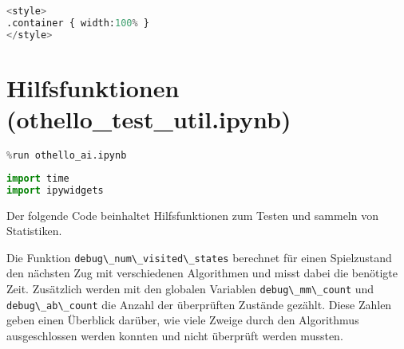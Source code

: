 \begin{lstlisting}[language=Python]
%%HTML
<style>
.container { width:100% }
</style>
\end{lstlisting}

\hypertarget{hilfsfunktionen-othello_test_util.ipynb}{%
\section{Hilfsfunktionen
(othello\_test\_util.ipynb)}\label{hilfsfunktionen-othello_test_util.ipynb}}

\begin{lstlisting}[language=Python]
%run othello_game.ipynb
%run othello_ai.ipynb
\end{lstlisting}

\begin{lstlisting}[language=Python]
import time
import ipywidgets
\end{lstlisting}

Der folgende Code beinhaltet Hilfsfunktionen zum Testen und sammeln von
Statistiken.

Die Funktion \passthrough{\lstinline!debug\_num\_visited\_states!}
berechnet für einen Spielzustand den nächsten Zug mit verschiedenen
Algorithmen und misst dabei die benötigte Zeit. Zusätzlich werden mit
den globalen Variablen \passthrough{\lstinline!debug\_mm\_count!} und
\passthrough{\lstinline!debug\_ab\_count!} die Anzahl der überprüften
Zustände gezählt. Diese Zahlen geben einen Überblick darüber, wie viele
Zweige durch den Algorithmus ausgeschlossen werden konnten und nicht
überprüft werden mussten.

